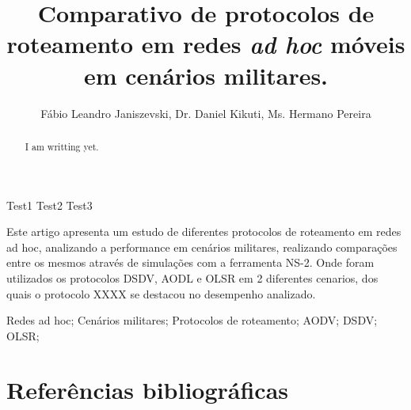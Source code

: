 \documentclass[12pt]{article}
\title{Comparativo de protocolos de roteamento em redes \textit{ad hoc} m\'oveis em cen\'arios militares.}
\author{
	F\'abio Leandro Janiszevski\inst{1}, 
	Dr. Daniel Kikuti\inst{1}, 
	Ms. Hermano Pereira\inst{2}
}
\begin{document}
\maketitle

\begin{abstract}
I am writting yet.
\end{abstract}

\begin{keyWord}
Test1 Test2 Test3
\end{keyWord}

\begin{resumo}
Este artigo apresenta um estudo de diferentes protocolos de roteamento em redes ad hoc, analizando a performance em cen\'arios militares, realizando compara\c{c}\~oes entre os mesmos atrav\'es de simula\c{c}\~oes com a ferramenta NS-2. 
Onde foram utilizados os protocolos DSDV, AODL e OLSR em 2 diferentes cenarios, dos quais o protocolo XXXX se destacou no desempenho analizado.
\end{resumo}

\begin{palavraChave}
Redes ad hoc; Cen\'arios militares; Protocolos de roteamento; AODV; DSDV; OLSR;
\end{palavraChave}


\section{Refer\^encias bibliogr\'aficas}


\end{document}
